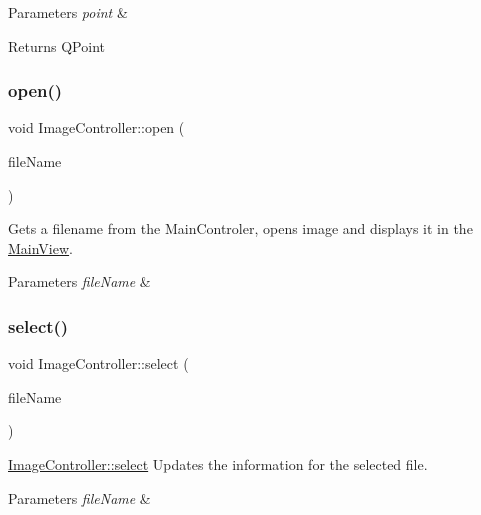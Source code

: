 \begin{DoxyParams}{Parameters}
{\em point} & \\
\hline
\end{DoxyParams}
\begin{DoxyReturn}{Returns}
Q\+Point 
\end{DoxyReturn}
\mbox{\label{classImageController_a3f5976d87977aa1cda7b5a9a7ad0f03b}} 
\subsubsection{\texorpdfstring{open()}{open()}}
{\footnotesize\ttfamily void Image\+Controller\+::open (\begin{DoxyParamCaption}\item[{const Q\+String \&}]{file\+Name }\end{DoxyParamCaption})}



Gets a filename from the Main\+Controler, opens image and displays it in the \hyperlink{classMainView}{Main\+View}. 


\begin{DoxyParams}{Parameters}
{\em file\+Name} & \\
\hline
\end{DoxyParams}
\mbox{\label{classImageController_a81d44568235778fe6d5dc14fb377499a}} 
\subsubsection{\texorpdfstring{select()}{select()}}
{\footnotesize\ttfamily void Image\+Controller\+::select (\begin{DoxyParamCaption}\item[{const Q\+String \&}]{file\+Name }\end{DoxyParamCaption})}



\hyperlink{classImageController_a81d44568235778fe6d5dc14fb377499a}{Image\+Controller\+::select} Updates the information for the selected file. 


\begin{DoxyParams}{Parameters}
{\em file\+Name} & \\
\hline
\end{DoxyParams}
\mbox{\label{classImageController_af9c9f284b985c7899a6bc3cf03e49191}} 
